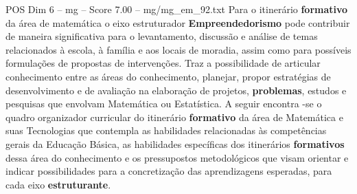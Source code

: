 \begin{textsample}{POS Dim 6 – mg – Score 7.00 – mg/mg\_em\_92.txt}
Para o itinerário \textbf{formativo} da área de matemática o eixo estruturador \textbf{Empreendedorismo} pode contribuir de maneira significativa para o levantamento, discussão e análise de temas relacionados à escola, à família e aos locais de moradia, assim como para possíveis formulações de propostas de intervenções.
Traz a possibilidade de articular conhecimento entre as áreas do conhecimento, planejar, propor estratégias de desenvolvimento e de avaliação na elaboração de projetos, \textbf{problemas}, estudos e pesquisas que envolvam Matemática ou Estatística.
A seguir encontra -se o quadro organizador curricular do itinerário \textbf{formativo} da área de Matemática e suas Tecnologias que contempla as habilidades relacionadas às competências gerais da Educação Básica, as habilidades específicas dos itinerários \textbf{formativos} dessa área do conhecimento e os pressupostos metodológicos que visam orientar e indicar possibilidades para a concretização das aprendizagens esperadas, para cada eixo \textbf{estruturante}.

\end{textsample}
